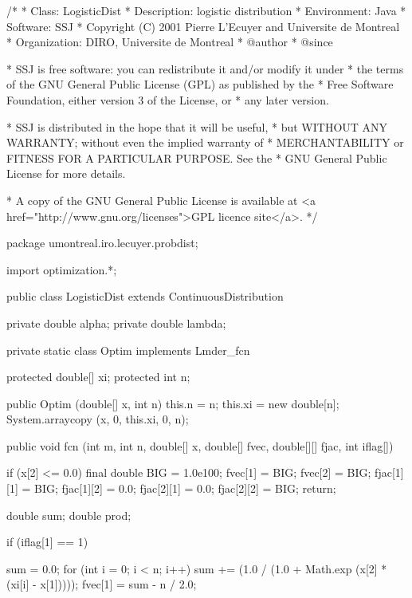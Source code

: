 \begin{code}
\begin{hide}
/*
 * Class:        LogisticDist
 * Description:  logistic distribution
 * Environment:  Java
 * Software:     SSJ
 * Copyright (C) 2001  Pierre L'Ecuyer and Universite de Montreal
 * Organization: DIRO, Universite de Montreal
 * @author
 * @since

 * SSJ is free software: you can redistribute it and/or modify it under
 * the terms of the GNU General Public License (GPL) as published by the
 * Free Software Foundation, either version 3 of the License, or
 * any later version.

 * SSJ is distributed in the hope that it will be useful,
 * but WITHOUT ANY WARRANTY; without even the implied warranty of
 * MERCHANTABILITY or FITNESS FOR A PARTICULAR PURPOSE.  See the
 * GNU General Public License for more details.

 * A copy of the GNU General Public License is available at
   <a href="http://www.gnu.org/licenses">GPL licence site</a>.
 */
\end{hide}
package umontreal.iro.lecuyer.probdist;
\begin{hide}
import optimization.*;
\end{hide}

public class LogisticDist extends ContinuousDistribution\begin{hide} {
   private double alpha;
   private double lambda;

   private static class Optim implements Lmder_fcn
   {
      protected double[] xi;
      protected int n;

      public Optim (double[] x, int n) {
         this.n = n;
         this.xi = new double[n];
         System.arraycopy (x, 0, this.xi, 0, n);
      }

      public void fcn (int m, int n, double[] x, double[] fvec, double[][] fjac, int iflag[])
      {
         if (x[2] <= 0.0) {
             final double BIG = 1.0e100;
             fvec[1] = BIG;
             fvec[2] = BIG;
             fjac[1][1] = BIG;
             fjac[1][2] = 0.0;
             fjac[2][1] = 0.0;
             fjac[2][2] = BIG;
             return;
         }

         double sum;
         double prod;

         if (iflag[1] == 1)
         {
            sum = 0.0;
            for (int i = 0; i < n; i++)
               sum += (1.0 / (1.0 + Math.exp (x[2] * (xi[i] - x[1]))));
            fvec[1] = sum - n / 2.0;

}}}}
\end{hide}
\end{code}
